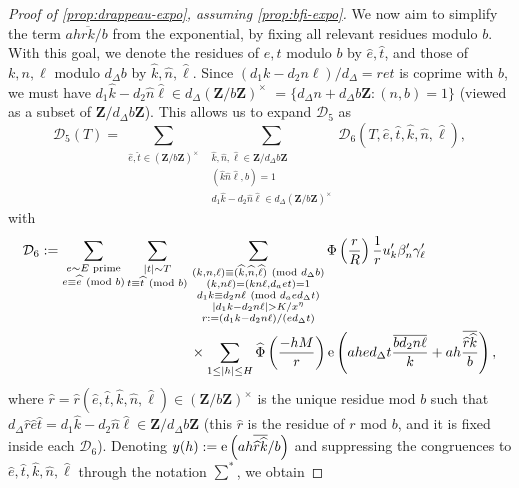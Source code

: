 \documentclass[reqno,11pt]{amsart}
\theoremstyle{definition}
\theoremstyle{remark}
\numberwithin{equation}{section}
\newcommand{\Z}{\mathbf{Z}}
\newcommand{\mD}{\mathcal{D}}
\newcommand{\e}{\textnormal{e}}
\renewcommand{\bar}{\overline}
\renewcommand{\hat}{\widehat}
\renewcommand{\pmod}[1]{\ (\textnormal{mod } #1)}
\begin{document}
\begin{proof}[Proof of \cref{prop:drappeau-expo}, assuming \cref{prop:bfi-expo}]
We now aim to simplify the term $ah \bar{rk}/b$ from the exponential, by fixing all relevant residues modulo $b$. With this goal, we denote the residues of $e, t$ modulo $b$ by $\hat{e}, \hat{t}$, and those of $k, n, \ell$ modulo $d_\Delta b$ by $\hat{k}, \hat{n}, \hat{\ell}$. Since $(d_1 k - d_2n\ell)/d_\Delta = ret$ is coprime with $b$, we must have $d_1 \hat{k} - d_2 \hat{n} \hat{\ell} \in d_\Delta (\Z/b\Z)^\times$ $= \{d_\Delta n + d_\Delta b \Z : (n, b) = 1\}$ (viewed as a subset of $\Z/d_\Delta b \Z$). This allows us to expand $\mD_5$ as
\begin{equation} \label{eq:D56}
    \mD_5(T) = \sum_{\substack{\hat{e}, \hat{t} \in (\Z/b\Z)^\times}} \sum_{\substack{\hat{k}, \hat{n}, \hat{\ell} \in \Z/d_\Delta b\Z \\ (\hat{k} \hat{n} \hat{\ell}, b) = 1 \\ 
    d_1 \hat{k} - d_2 \hat{n} \hat{\ell} \in d_\Delta (\Z/b\Z)^\times}}
    \mD_6\left(T, \hat{e}, \hat{t}, \hat{k}, \hat{n}, \hat{\ell}\right),
\end{equation}
with
\[
\begin{aligned}
    \mD_6 := \sum_{\substack{e \sim E \text{ prime} \\ e \equiv \hat{e} \pmod{b}}}
    \sum_{\substack{|t| \sim T \\ t \equiv \hat{t} \pmod{b}}}\,
    &\sum_{\substack{(k, n, \ell) \equiv (\hat{k}, \hat{n}, \hat{\ell}) \pmod{d_\Delta b} \\ (k, n\ell) = (k n \ell, d_aet) = 1 \\ d_1k \equiv d_2n \ell \pmod{d_aed_\Delta t} \\ |d_1k - d_2n \ell| > K/x^\eta \\ r := (d_1 k - d_2 n \ell)/(ed_\Delta t)}} 
    \Phi\left(\frac{r}{R}\right) \frac{1}{r} 
    u'_k \beta'_n \gamma'_\ell 
    \\
    &\times \sum_{1 \le |h| \le H} \hat{\Phi}\left(\frac{-hM}{r}\right) \e\left(ahe d_\Delta t \frac{\bar{b d_2n \ell}}{k} + ah\frac{\bar{\hat{r}\hat{k}}}{b} \right),
\end{aligned}
\]
where $\hat{r} = \hat{r}(\hat{e}, \hat{t}, \hat{k}, \hat{n}, \hat{\ell}) \in (\Z/b\Z)^\times$ is the unique residue mod $b$ such that $d_\Delta \hat{r} \hat{e} \hat{t} = d_1 \hat{k} - d_2 \hat{n} \hat{\ell} \in \Z/d_\Delta b \Z$ (this $\hat{r}$ is the residue of $r$ mod $b$, and it is fixed inside each $\mD_6$). Denoting $y(h) := \e\left( ah\bar{\hat{r} \hat{k}}/b \right)$ and suppressing the congruences to $\hat{e}, \hat{t}, \hat{k}, \hat{n}, \hat{\ell}$ through the notation $\sum^*$, we obtain

\end{proof}
\end{document}
